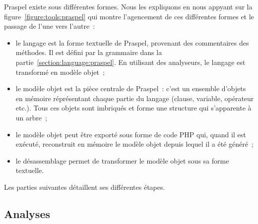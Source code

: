 Praspel existe sous différentes formes. Nous les expliquons en nous appyant sur
la figure~\ref{figure:tools:praspel} qui montre l'agencement de ces différentes
formes et le passage de l'une vers l'autre~:
%
\begin{itemize}

\item le langage est la forme textuelle de Praspel, provenant des commentaires
des méthodes. Il est défini par la grammaire dans la
partie~\ref{section:language:praspel}. En utilisant des analyseurs, le langage
est transformé en modèle objet~;

\item le modèle objet est la pièce centrale de Praspel~: c'est un ensemble
d'objets en mémoire réprésentant chaque partie du langage (clause, variable,
opérateur etc.). Tous ces objets sont imbriqués et forme une structure qui
s'apparente à un arbre~;

\item le modèle objet peut être exporté sous forme de code PHP qui, quand il est
exécuté, reconstruit en mémoire le modèle objet depuis lequel il a été généré~;

\item le désassemblage permet de transformer le modèle objet sous sa forme
textuelle.

\end{itemize}
%
Les parties suivantes détaillent ses différentes étapes.

\subsection{Analyses}
\label{subsection:tools:interpretation}

